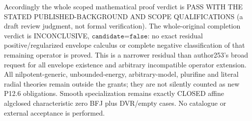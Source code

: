 Accordingly the whole scoped mathematical proof verdict is PASS WITH THE STATED PUBLISHED-BACKGROUND AND SCOPE QUALIFICATIONS (a draft review judgment, not formal verification). The whole-original completion verdict is INCONCLUSIVE, $\texttt{candidate=false}$: no exact residual positive/regularized envelope calculus or complete negative classification of that remaining operator is proved. This is a narrower residual than author253's broad request for all envelope existence and arbitrary incompatible operator extension. All nilpotent-generic, unbounded-energy, arbitrary-model, plurifine and literal radial theories remain outside the grants; they are not silently counted as new P12.6 obligations. Smooth specialization remains exactly CLOSED affine algclosed characteristic zero BFJ plus DVR/empty cases. No catalogue or external acceptance is performed.
